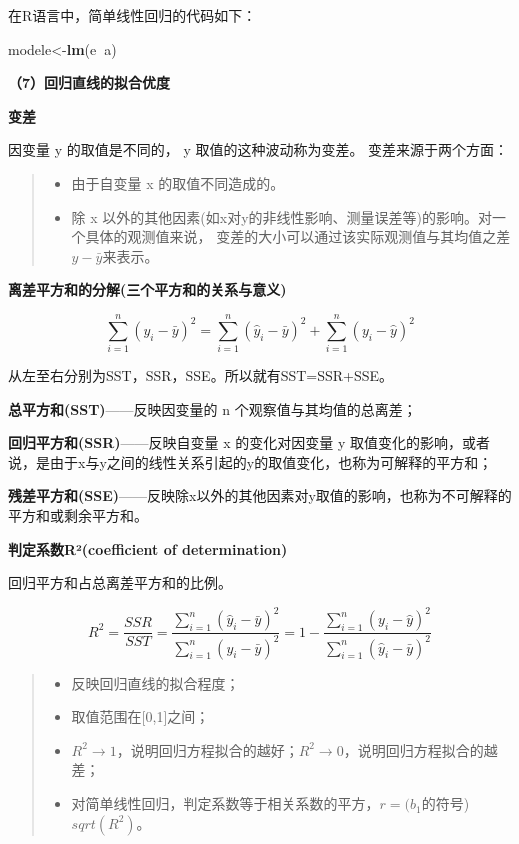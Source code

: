 \documentclass[]{ctexbook}
\newenvironment{Shaded}{\begin{snugshade}}{\end{snugshade}}
\newcommand{\KeywordTok}[1]{\textcolor[rgb]{0.13,0.29,0.53}{\textbf{#1}}}
\newcommand{\NormalTok}[1]{#1}
\newcommand{\OperatorTok}[1]{\textcolor[rgb]{0.81,0.36,0.00}{\textbf{#1}}}
\providecommand{\tightlist}{%
  \setlength{\itemsep}{0pt}\setlength{\parskip}{0pt}}
\begin{document}
在R语言中，简单线性回归的代码如下：

\begin{Shaded}
\begin{Highlighting}[]
\NormalTok{modele<-}\KeywordTok{lm}\NormalTok{(e}\OperatorTok{~}\NormalTok{a)}
\end{Highlighting}
\end{Shaded}

\textbf{（7）回归直线的拟合优度}

\textbf{变差}

因变量 y 的取值是不同的， y 取值的这种波动称为变差。 变差来源于两个方面：

\begin{quote}
\begin{itemize}
\tightlist
\item
  由于自变量 x 的取值不同造成的。
\item
  除 x 以外的其他因素(如x对y的非线性影响、测量误差等)的影响。对一个具体的观测值来说， 变差的大小可以通过该实际观测值与其均值之差\(y-\bar y\)来表示。
\end{itemize}
\end{quote}

\textbf{离差平方和的分解(三个平方和的关系与意义)}

\[\sum_{i=1}^n(y_i-\bar y)^2=\sum_{i=1}^n(\hat y_i-\bar y)^2+\sum_{i=1}^n(y_i-\hat y)^2\]

从左至右分别为SST，SSR，SSE。所以就有SST=SSR+SSE。

\textbf{总平方和(SST)}------反映因变量的 n 个观察值与其均值的总离差；

\textbf{回归平方和(SSR)}------反映自变量 x 的变化对因变量 y 取值变化的影响，或者说，是由于x与y之间的线性关系引起的y的取值变化，也称为可解释的平方和；

\textbf{残差平方和(SSE)}------反映除x以外的其他因素对y取值的影响，也称为不可解释的平方和或剩余平方和。

\textbf{判定系数R²(coefficient of determination)}

回归平方和占总离差平方和的比例。

\[R^2=\frac{SSR}{SST}=\frac{\sum_{i=1}^n(\hat y_i-\bar y)^2}{\sum_{i=1}^n(y_i-\bar y)^2}=1-\frac{\sum_{i=1}^n(y_i-\hat y)^2}{\sum_{i=1}^n(\hat y_i-\bar y)^2}\]

\begin{quote}
\begin{itemize}
\tightlist
\item
  反映回归直线的拟合程度；
\item
  取值范围在{[}0,1{]}之间；
\item
  \(R^2\rightarrow1\)，说明回归方程拟合的越好；\(R^2\rightarrow0\)，说明回归方程拟合的越差；
\item
  对简单线性回归，判定系数等于相关系数的平方，\(r=(b_1\)的符号)\(sqrt(R^2)\)。
\end{itemize}
\end{quote}
\end{document}
